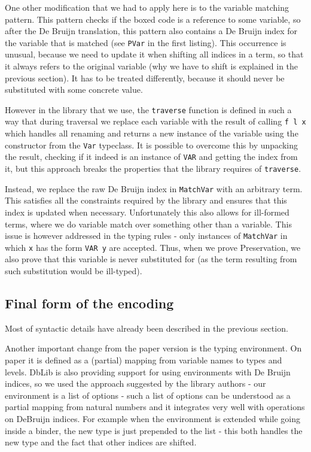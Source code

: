 \documentclass[runningheads]{article}
\begin{document}
One other modification that we had to apply here is to the variable matching pattern. This pattern checks if the boxed code is a reference to some variable, so after the De Bruijn translation, this pattern also contains a De Bruijn index for the variable that is matched (see \texttt{PVar} in the first listing). This occurrence is unusual, because we need to update it when shifting all indices in a term, so that it always refers to the original variable (why we have to shift is explained in the previous section). It has to be treated differently, because it should never be substituted with some concrete value.

However in the library that we use, the \texttt{traverse} function is defined in such a way that during traversal we replace each variable with the result of calling \texttt{f l x} which handles all renaming and returns a new instance of the variable using the constructor from the \texttt{Var} typeclass. It is possible to overcome this by unpacking the result, checking if it indeed is an instance of \texttt{VAR} and getting the index from it, but this approach breaks the properties that the library requires of \texttt{traverse}.

Instead, we replace the raw De Bruijn index in \texttt{MatchVar} with an arbitrary term. This satisfies all the constraints required by the library and ensures that this index is updated when necessary. Unfortunately this also allows for ill-formed terms, where we do variable match over something other than a variable. This issue is however addressed in the typing rules - only instances of \texttt{MatchVar} in which \texttt{x} has the form \texttt{VAR y} are accepted. Thus, when we prove Preservation, we also prove that this variable is never substituted for (as the term resulting from such substitution would be ill-typed).

\subsection{Final form of the encoding}
Most of syntactic details have already been described in the previous section.

Another important change from the paper version is the typing environment. On paper it is defined as a (partial) mapping from variable names to types and levels.
DbLib is also providing support for using environments with De Bruijn indices, so we used the approach suggested by the library authors - our environment is a list of options - such a list of options can be understood as a partial mapping from natural numbers and it integrates very well with operations on DeBruijn indices. For example when the environment is extended while going inside a binder, the new type is just prepended to the list - this both handles the new type and the fact that other indices are shifted.
\end{document}
